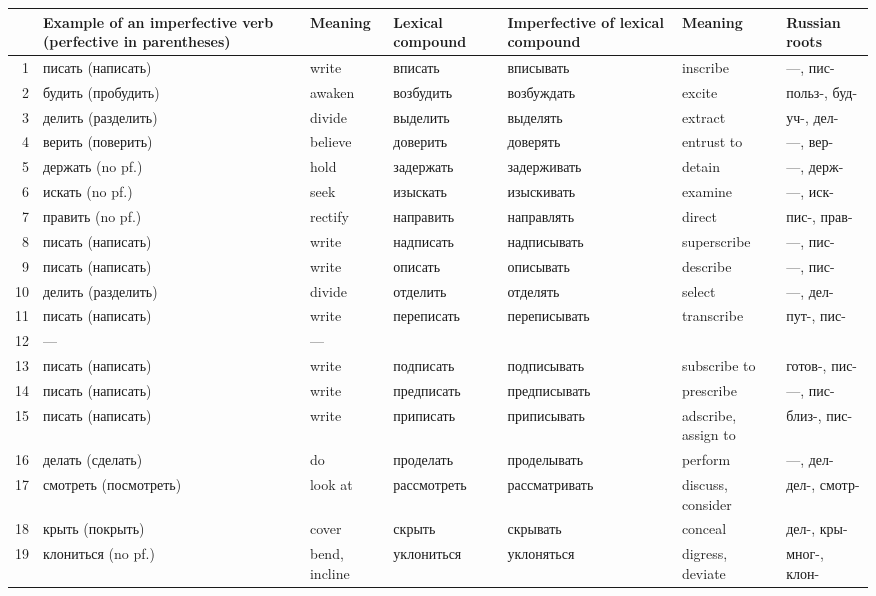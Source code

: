 \begingroup
\footnotesize
\setlength{\tabcolsep}{2.2pt}
\renewcommand{\arraystretch}{1.08}
\begin{longtable}{@{}r >{\cyrillicfont}p{27mm} p{16mm} >{\cyrillicfont}p{21mm} >{\cyrillicfont}p{24mm} p{23mm} >{\cyrillicfont}p{18mm}@{}}
\toprule
& \normalfont Example of an imperfective verb (perfective in parentheses) & Meaning & \normalfont Lexical compound & \normalfont Imperfective of lexical compound & Meaning & \normalfont Russian roots\\
\midrule
\endhead
1 & писать (написать) & write & вписать & вписывать & inscribe & ---, пис-\\
2 & будить (пробудить) & awaken & возбудить & возбуждать & excite & польз-, буд-\\
3 & делить (разделить) & divide & выделить & выделять & extract & уч-, дел-\\
4 & верить (поверить) & believe & доверить & доверять & entrust to & ---, вер-\\
5 & держать (no pf.) & hold & задержать & задерживать & detain & ---, держ-\\
6 & искать (no pf.) & seek & изыскать & изыскивать & examine & ---, иск-\\
7 & править (no pf.) & rectify & направить & направлять & direct & пис-, прав-\\
8 & писать (написать) & write & надписать & надписывать & superscribe & ---, пис-\\
9 & писать (написать) & write & описать & описывать & describe & ---, пис-\\
10 & делить (разделить) & divide & отделить & отделять & select & ---, дел-\\
11 & писать (написать) & write & переписать & переписывать & transcribe & пут-, пис-\\
12 & --- & --- & \multicolumn{4}{l}{\normalfont (almost all compounds with \ru{по-} are purely aspectual)}\\
13 & писать (написать) & write & подписать & подписывать & subscribe to & готов-, пис-\\
14 & писать (написать) & write & предписать & предписывать & prescribe & ---, пис-\\
15 & писать (написать) & write & приписать & приписывать & adscribe, assign to & близ-, пис-\\
16 & делать (сделать) & do & проделать & проделывать & perform & ---, дел-\\
17 & смотреть (посмотреть) & look at & рассмотреть & рассматривать & discuss, consider & дел-, смотр-\\
18 & крыть (покрыть) & cover & скрыть & скрывать & conceal & дел-, кры-\\
19 & клониться (no pf.) & bend, incline & уклониться & уклоняться & digress, deviate & мног-, клон-\\
\bottomrule
\end{longtable}
\endgroup

